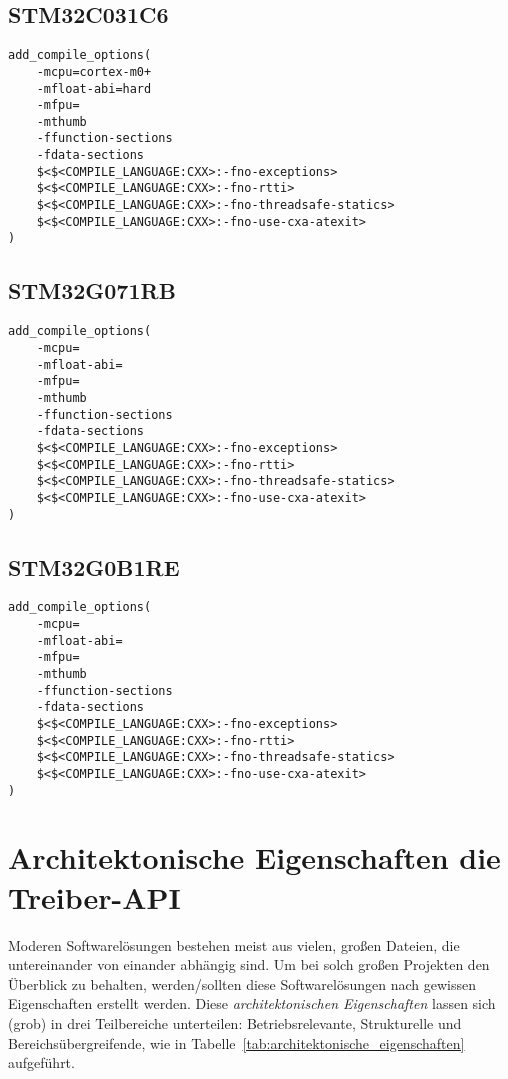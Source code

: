 
\subsection{STM32C031C6}
\begin{lstlisting}
add_compile_options(
	-mcpu=cortex-m0+
	-mfloat-abi=hard
	-mfpu=
	-mthumb
	-ffunction-sections
	-fdata-sections
	$<$<COMPILE_LANGUAGE:CXX>:-fno-exceptions>
	$<$<COMPILE_LANGUAGE:CXX>:-fno-rtti>
	$<$<COMPILE_LANGUAGE:CXX>:-fno-threadsafe-statics>
	$<$<COMPILE_LANGUAGE:CXX>:-fno-use-cxa-atexit>		
)
\end{lstlisting}


\subsection{STM32G071RB}
\begin{lstlisting}
add_compile_options(
	-mcpu=
	-mfloat-abi=
	-mfpu=
	-mthumb
	-ffunction-sections
	-fdata-sections
	$<$<COMPILE_LANGUAGE:CXX>:-fno-exceptions>
	$<$<COMPILE_LANGUAGE:CXX>:-fno-rtti>
	$<$<COMPILE_LANGUAGE:CXX>:-fno-threadsafe-statics>
	$<$<COMPILE_LANGUAGE:CXX>:-fno-use-cxa-atexit>
)
\end{lstlisting}


\subsection{STM32G0B1RE}
\begin{lstlisting}
add_compile_options(
	-mcpu=
	-mfloat-abi=
	-mfpu=
	-mthumb
	-ffunction-sections
	-fdata-sections
	$<$<COMPILE_LANGUAGE:CXX>:-fno-exceptions>
	$<$<COMPILE_LANGUAGE:CXX>:-fno-rtti>
	$<$<COMPILE_LANGUAGE:CXX>:-fno-threadsafe-statics>
	$<$<COMPILE_LANGUAGE:CXX>:-fno-use-cxa-atexit>
)
\end{lstlisting}


\section{Architektonische Eigenschaften die Treiber-API}
Moderen Softwarelösungen bestehen meist aus vielen, großen Dateien, die untereinander von einander abhängig sind.
Um bei solch großen Projekten den Überblick zu behalten, werden/sollten diese Softwarelösungen nach gewissen Eigenschaften erstellt werden.
Diese \emph{architektonischen Eigenschaften} lassen sich (grob) in drei Teilbereiche unterteilen: Betriebsrelevante, Strukturelle und Bereichsübergreifende, wie in Tabelle~\ref{tab:architektonische_eigenschaften} aufgeführt. %

